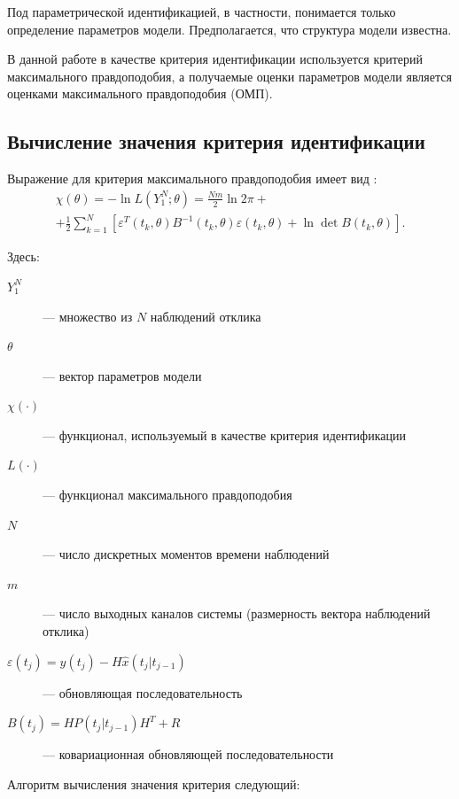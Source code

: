 \documentclass[a4paper,14pt]{extarticle}
\begin{document}
Под параметрической идентификацией, в частности, понимается только определение
параметров модели. Предполагается, что структура модели известна.

В данной работе в качестве критерия идентификации используется критерий
максимального правдоподобия, а получаемые оценки параметров модели является
оценками максимального правдоподобия (ОМП).

\subsection{Вычисление значения критерия идентификации}

\newcommand{\eps}{\varepsilon}

Выражение для критерия максимального правдоподобия имеет вид \cite{denisov}:
\begin{equation}
\begin{split}
\chi(\theta) = -\ln{L(Y_1^N;\theta)} = \frac{Nm}{2} \ln{2\pi} +
\\ + \frac{1}{2} \sum\limits_{k=1}^{N} 
\left[ \eps^T(t_k, \theta) B^{-1}(t_k, \theta) \eps(t_k, \theta) + 
\ln \det B(t_k, \theta) \right].
\end{split}
\end{equation}

Здесь:

\begin{description}
\item[$Y_1^N$] --- множество из $N$ наблюдений отклика
\item[$\theta$] --- вектор параметров модели 
\item[$\chi(\cdot)$] --- функционал, используемый в качестве критерия
идентификации
\item[$L(\cdot)$] --- функционал максимального правдоподобия 
\item[$N$] --- число дискретных моментов времени наблюдений
\item[$m$] --- число выходных каналов системы (размерность вектора наблюдений
отклика)
\item[$\eps(t_j) = y(t_j) - H \hat{x}(t_j|t_{j-1})$] --- обновляющая
последовательность 
\item[$B(t_j) = HP(t_j|t_{j-1})H^T + R$] --- ковариационная обновляющей
последовательности 
\end{description}

\newpage
Алгоритм вычисления значения критерия следующий:
\end{document}
